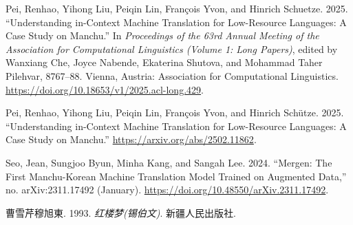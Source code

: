\documentclass[
  letterpaper,
  DIV=11,
  numbers=noendperiod]{scrartcl}
\newlength{\cslhangindent}
\newenvironment{CSLReferences}[2] %
 {\begin{list}{}{%
  \setlength{\itemindent}{0pt}
  \setlength{\leftmargin}{0pt}
  \setlength{\parsep}{0pt}
  \ifodd #1
   \setlength{\leftmargin}{\cslhangindent}
   \setlength{\itemindent}{-1\cslhangindent}
  \fi
  \setlength{\itemsep}{#2\baselineskip}}}
 {\end{list}}
\begin{document}
\begin{CSLReferences}{1}{0}
Pei, Renhao, Yihong Liu, Peiqin Lin, François Yvon, and Hinrich
Schuetze. 2025. {``Understanding in-Context Machine Translation for
Low-Resource Languages: A Case Study on {M}anchu.''} In
\emph{Proceedings of the 63rd Annual Meeting of the Association for
Computational Linguistics (Volume 1: Long Papers)}, edited by Wanxiang
Che, Joyce Nabende, Ekaterina Shutova, and Mohammad Taher Pilehvar,
8767--88. Vienna, Austria: Association for Computational Linguistics.
\url{https://doi.org/10.18653/v1/2025.acl-long.429}.

Pei, Renhao, Yihong Liu, Peiqin Lin, François Yvon, and Hinrich Schütze.
2025. {``Understanding in-Context Machine Translation for Low-Resource
Languages: A Case Study on Manchu.''}
\url{https://arxiv.org/abs/2502.11862}.

Seo, Jean, Sungjoo Byun, Minha Kang, and Sangah Lee. 2024. {``Mergen:
{The First Manchu-Korean Machine Translation Model Trained} on
{Augmented Data},''} no. arXiv:2311.17492 (January).
\url{https://doi.org/10.48550/arXiv.2311.17492}.

曹雪芹穆旭東. 1993. \emph{{红楼梦(锡伯文)}}. 新疆人民出版社.

\end{CSLReferences}
\end{document}
